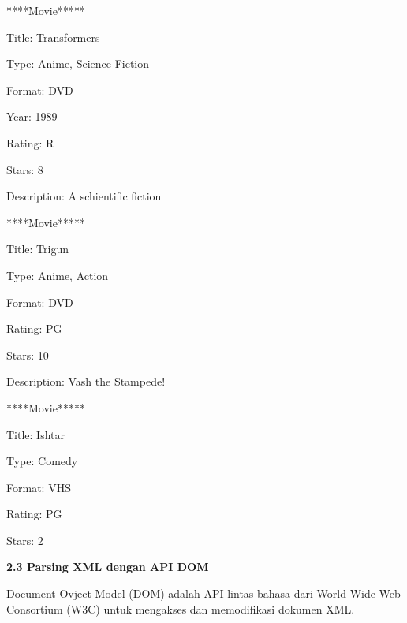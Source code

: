 \noindent 
{\fontsize{10pt}{10pt}\selectfont *****Movie*****} \par
\noindent 
{\fontsize{10pt}{10pt}\selectfont Title: Transformers} \par
\noindent 
{\fontsize{10pt}{10pt}\selectfont Type: Anime, Science Fiction} \par
\noindent 
{\fontsize{10pt}{10pt}\selectfont Format: DVD} \par
\noindent 
{\fontsize{10pt}{10pt}\selectfont Year: 1989} \par
\noindent 
{\fontsize{10pt}{10pt}\selectfont Rating: R} \par
\noindent 
{\fontsize{10pt}{10pt}\selectfont Stars: 8} \par
\noindent 
{\fontsize{10pt}{10pt}\selectfont Description: A schientific fiction} \par
\noindent 
{\fontsize{10pt}{10pt}\selectfont *****Movie*****} \par
\noindent 
{\fontsize{10pt}{10pt}\selectfont Title: Trigun} \par
\noindent 
{\fontsize{10pt}{10pt}\selectfont Type: Anime, Action} \par
\noindent 
{\fontsize{10pt}{10pt}\selectfont Format: DVD} \par
\noindent 
{\fontsize{10pt}{10pt}\selectfont Rating: PG} \par
\noindent 
{\fontsize{10pt}{10pt}\selectfont Stars: 10} \par
\noindent 
{\fontsize{10pt}{10pt}\selectfont Description: Vash the Stampede!} \par
\noindent 
{\fontsize{10pt}{10pt}\selectfont *****Movie*****} \par
\noindent 
{\fontsize{10pt}{10pt}\selectfont Title: Ishtar} \par
\noindent 
{\fontsize{10pt}{10pt}\selectfont Type: Comedy} \par
\noindent 
{\fontsize{10pt}{10pt}\selectfont Format: VHS} \par
\noindent 
{\fontsize{10pt}{10pt}\selectfont Rating: PG} \par
\noindent 
{\fontsize{10pt}{10pt}\selectfont Stars: 2} \par
\noindent 
\vspace{10pt}
\noindent 
\textbf{2.3 Parsing XML dengan API DOM} \par
\noindent 
 \hspace*{0.5in} Document Ovject Model (DOM) adalah API lintas bahasa dari World Wide Web Consortium (W3C) untuk mengakses dan memodifikasi dokumen XML. \par
